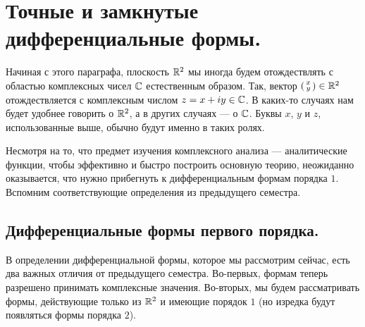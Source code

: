 \documentclass[../complex-analysis.tex]{subfiles}
\begin{document}
\section{Точные и замкнутые дифференциальные формы.}

\begin{conventn*}
 Начиная с этого параграфа, плоскость $\mathbb{R}^{2}$ мы иногда будем отождествлять с областью комплексных чисел $\mathbb{C}$ естественным образом. Так, вектор $ \begin{psmallmatrix}
  x \\ y
 \end{psmallmatrix} \in \mathbb{R}^{2}$ отождествляется с комплексным числом $z = x+iy \in \mathbb{C}$. В каких-то случаях нам будет удобнее говорить о $\mathbb{R}^{2}$, а в других случаях --- о $\mathbb{C}$. Буквы $ x $, $ y $ и $ z $, использованные выше, обычно будут именно в таких ролях.
\end{conventn*}


Несмотря на то, что предмет изучения комплексного анализа --- аналитические функции, чтобы эффективно и быстро построить основную теорию, неожиданно оказывается, что нужно прибегнуть к дифференциальным формам порядка $1$. Вспомним соответствующие определения из предыдущего семестра.

\subsection{Дифференциальные формы первого порядка.}

В определении дифференциальной формы, которое мы рассмотрим сейчас,  есть два важных отличия от предыдущего семестра. Во-первых, формам теперь разрешено принимать комплексные значения. Во-вторых, мы будем рассматривать формы, действующие только из $\mathbb{R}^{2}$ и имеющие порядок $1$ (но изредка будут появляться формы порядка $ 2 $).
\end{document}
